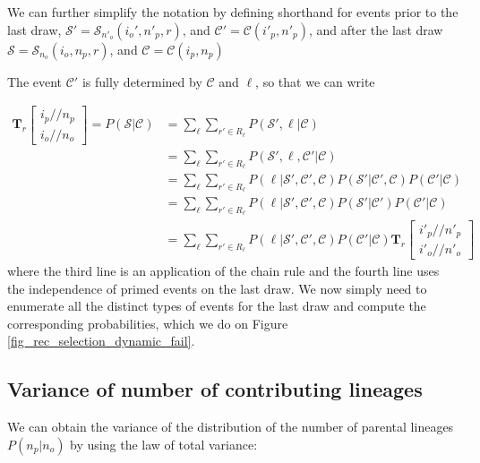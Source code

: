 \documentclass[review]{elsarticle}
\newcommand{\dslash}{/\!\!/}
\newcommand{\Coalc}[4]{\begin{bmatrix}#1\dslash #2 \\ #3\dslash #4 \end{bmatrix}}
\newcommand{\CC}{\mathcal{C}}
\newcommand{\ms}{\mathcal{S}}
\begin{document}
We can further simplify the notation by defining shorthand for events prior to the last draw,
 $\ms' = \ms_{n'_o}(i_o', n'_p, r)$, and $\CC' = \CC{(i'_p,n'_p)}$, and after the
last draw $\ms = \ms_{n_o}(i_o, n_p, r)$, and $\CC = \CC{(i_p,n_p)}$

The event  $\CC'$ is fully determined by  $\CC$ and $\ell$, so that we can write

\begin{equation}
  \begin{split}
    \mathbf{T}_{r}\Coalc{i_p}{n_p}{i_o}{n_o} = P(\ms| \CC) &= \sum_\ell \sum_{r' \in R_\ell}
    P(\ms',\ell | \CC) \\ 
    &=\sum_\ell \sum_{r' \in R_\ell}P( \ms',\ell, \CC' |\CC) \\
    &=\sum_\ell \sum_{r' \in R_\ell}P(\ell | \ms', \CC', \CC ) P( \ms'| \CC', \CC)  P(\CC' |\CC) \\
    &=\sum_\ell \sum_{r' \in R_\ell}P(\ell | \ms', \CC', \CC ) P( \ms'| \CC')       P(\CC' |\CC) \\
    &=\sum_\ell \sum_{r' \in R_\ell}P(\ell | \ms', \CC', \CC ) P(\CC' |\CC)  \mathbf{T}_{r}\Coalc{i'_p}{n'_p}{i'_o}{n'_o}
  \end{split}
\end{equation}
where the third line is an application of the chain rule and the fourth line uses the independence
of primed events on the last draw.  We now simply need to enumerate all the distinct types of
events for the last draw and compute the corresponding probabilities, which we do on Figure
\ref{fig_rec_selection_dynamic_fail}.


\subsection{Variance of number of contributing lineages}
\label{subsec_apx_variance}

We can obtain the variance of the distribution of the number of parental lineages $P(n_p | n_o)$ by using the law of total variance:
\end{document}
